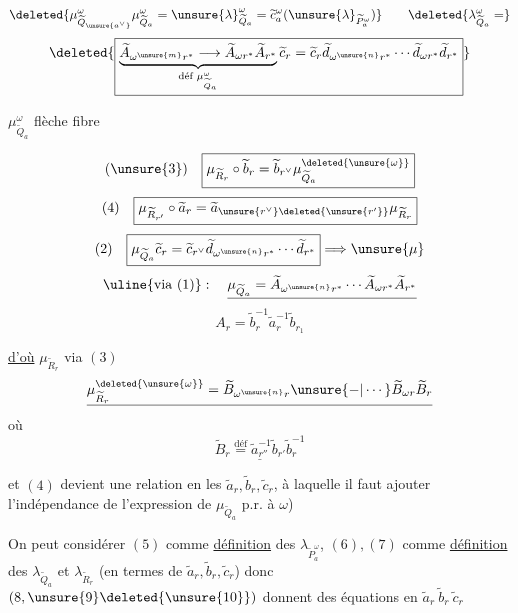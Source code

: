\[
\deleted{\mu_{\widetilde Q_{\unsure{a^\vee}}}^{\omega}\mu_{\widetilde Q_a}^{\omega}
=\unsure{\lambda}_{\widetilde Q_a}^{\omega}
=\widetilde c_a^\omega(\unsure{\lambda}_{\widetilde P_a^\omega})}
\qquad
\deleted{\lambda_{\widetilde Q_a}^{\omega}=}
\]
\[
\deleted{\boxed{
\underbrace{\widetilde A_{\omega^{\unsure{m}}r^*}\longrightarrow
\widetilde A_{\omega r^*}\widetilde A_{r^*}}_{\text{déf }\mu_{\widetilde Q_a}^{\omega}}
\widetilde c_r=\widetilde c_r\widetilde d_{\omega^{\unsure{n}}r^*}\cdots
\widetilde d_{\omega r^*}\widetilde d_{r^*}}}
\]

$\mu_{\widetilde Q_a}^{\omega}$ flèche fibre

\[
(\unsure{3})\quad\boxed{\mu_{\widetilde R_r}\circ\widetilde b_r
=\widetilde b_{r^\vee}\mu_{\widetilde Q_a}^{\deleted{\unsure{\omega}}}}
\]
\[
(4)\quad\boxed{\mu_{\widetilde R_{r'}}\circ\widetilde a_r
=\widetilde a_{\unsure{r^\vee}\deleted{\unsure{r'}}}\mu_{\widetilde R_r}}
\]
\[
(2)\quad\boxed{\mu_{\widetilde Q_a}\widetilde c_r
=\widetilde c_{r^\vee}\widetilde d_{\omega^{\unsure{n}}r^*}\cdots\widetilde d_{r^*}}
\Longrightarrow\unsure{\mu}
\]
\[
\uline{\text{via (1)}}:\quad
\underline{\mu_{\widetilde Q_a}
=\widetilde A_{\omega^{\unsure{n}}r^*}\cdots\widetilde A_{\omega r^*}\widetilde A_{r^*}}
\]
\[
A_r=\widetilde b_r^{-1}\widetilde a_r^{-1}\widetilde b_{r_1}
\]

\uline{d'où} $\mu_{\widetilde R_r}$ via $(3)$
\[
\underline{\mu_{\widetilde R_r}^{\deleted{\unsure{\omega}}}
=\widetilde B_{\omega^{\unsure{n}}r}\unsure{-|\cdots}\widetilde B_{\omega r}\widetilde B_r}
\]
où
\[
\underline{\widetilde B_r\overset{\text{déf}}{=}\widetilde a_{r''}^{-1}\widetilde b_{r'}\widetilde b_r^{-1}}
\]

et $(4)$ devient une relation en les $\widetilde a_r,\widetilde b_r,\widetilde c_r$, à laquelle il faut ajouter l'indépendance de l'expression de $\mu_{\widetilde Q_a}$ p.r. à $\omega$)



On peut considérer $(5)$ comme \uline{définition} des $\lambda_{\widetilde P_a^\omega}$, $(6),(7)$ comme \uline{définition} des $\lambda_{\widetilde Q_a}$ et $\lambda_{\widetilde R_r}$ (en termes de $\widetilde a_r,\widetilde b_r,\widetilde c_r$) donc $(8,\unsure{9}\deleted{\unsure{10}})$ donnent des équations en $\widetilde a_r\ \widetilde b_r\ \widetilde c_r$
